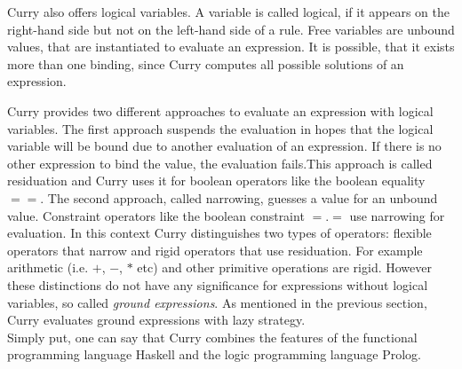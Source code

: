 \documentclass[%
	pdftex,%
	a4paper,%
	oneside,%
	chapterprefix,%
	headsepline,%
	12pt%
]{scrbook}
\begin{document}
Curry also offers logical variables. A variable is called logical, if
it appears on the right-hand side but not on the left-hand side of a
rule. Free variables are unbound values, that are instantiated to
evaluate an expression. It is possible, that it exists more than one
binding, since Curry computes all possible solutions of an expression.


Curry provides two different approaches to evaluate an expression with
logical variables. The first approach suspends the evaluation in hopes
that the logical variable will be bound due to another evaluation of
an expression. If there is no other expression to bind the value, the
evaluation fails.This approach is called residuation and Curry uses it
for boolean operators like the boolean equality \ensuremath{==}.  The second
approach, called narrowing, guesses a value for an unbound
value. Constraint operators like the boolean constraint \ensuremath{\mathbin{=.=}} use
narrowing for evaluation. In this context Curry distinguishes two
types of operators: flexible operators that narrow and rigid operators
that use residuation. For example arithmetic (i.e. \ensuremath{\mathbin{+}}, \ensuremath{\mathbin{-}}, \ensuremath{\mathbin{*}} etc)
and other primitive operations are rigid. However these distinctions
do not have any significance for expressions without logical
variables, so called \emph{ground expressions}. As mentioned in the
previous section, Curry evaluates ground expressions with lazy
strategy.\\

Simply put, one can say that Curry combines the features of the
functional programming language Haskell and the logic programming
language Prolog.

\end{document}
